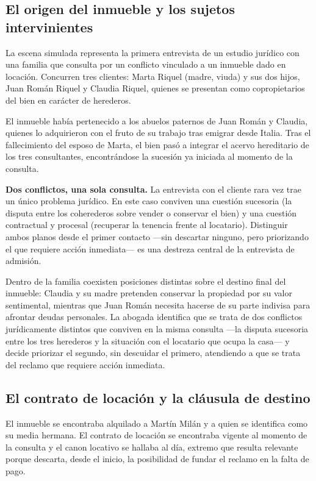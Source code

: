 \documentclass[12pt,oneside]{book}
\begin{document}
\subsection{El origen del inmueble y los sujetos intervinientes}

La escena simulada representa la primera entrevista de un estudio jurídico con una familia que consulta por un conflicto vinculado a un inmueble dado en locación. Concurren tres clientes: Marta Riquel (madre, viuda) y sus dos hijos, Juan Román Riquel y Claudia Riquel, quienes se presentan como copropietarios del bien en carácter de herederos.

El inmueble había pertenecido a los abuelos paternos de Juan Román y Claudia, quienes lo adquirieron con el fruto de su trabajo tras emigrar desde Italia. Tras el fallecimiento del esposo de Marta, el bien pasó a integrar el acervo hereditario de los tres consultantes, encontrándose la sucesión ya iniciada al momento de la consulta.

\begin{important}
\textbf{Dos conflictos, una sola consulta.} La entrevista con el cliente rara vez trae un único problema jurídico. En este caso conviven una cuestión sucesoria (la disputa entre los coherederos sobre vender o conservar el bien) y una cuestión contractual y procesal (recuperar la tenencia frente al locatario). Distinguir ambos planos desde el primer contacto —sin descartar ninguno, pero priorizando el que requiere acción inmediata— es una destreza central de la entrevista de admisión.
\end{important}

Dentro de la familia coexisten posiciones distintas sobre el destino final del inmueble: Claudia y su madre pretenden conservar la propiedad por su valor sentimental, mientras que Juan Román necesita hacerse de su parte indivisa para afrontar deudas personales. La abogada identifica que se trata de dos conflictos jurídicamente distintos que conviven en la misma consulta —la disputa sucesoria entre los tres herederos y la situación con el locatario que ocupa la casa— y decide priorizar el segundo, sin descuidar el primero, atendiendo a que se trata del reclamo que requiere acción inmediata.

\subsection{El contrato de locación y la cláusula de destino}

El inmueble se encontraba alquilado a Martín Milán y a quien se identifica como su media hermana. El contrato de locación se encontraba vigente al momento de la consulta y el canon locativo se hallaba al día, extremo que resulta relevante porque descarta, desde el inicio, la posibilidad de fundar el reclamo en la falta de pago.
\end{document}
